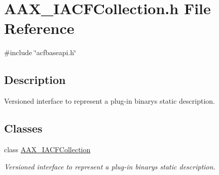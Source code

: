 \hypertarget{a00509}{}\section{A\+A\+X\+\_\+\+I\+A\+C\+F\+Collection.\+h File Reference}
\label{a00509}
{\ttfamily \#include \char`\"{}acfbaseapi.\+h\char`\"{}}\newline


\subsection{Description}
Versioned interface to represent a plug-\/in binary\textquotesingle{}s static description. 

\subsection*{Classes}
\begin{DoxyCompactItemize}
\item 
class \mbox{\hyperlink{a01621}{A\+A\+X\+\_\+\+I\+A\+C\+F\+Collection}}
\begin{DoxyCompactList}\small\item\em Versioned interface to represent a plug-\/in binary\textquotesingle{}s static description. \end{DoxyCompactList}\end{DoxyCompactItemize}
